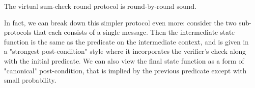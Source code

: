 \begin{theorem}
    The virtual sum-check round protocol is round-by-round sound.
    \label{thm:virtual_sumcheck_round_protocol_rbr_sound}
\end{theorem}

In fact, we can break down this simpler protocol even more: consider the two sub-protocols that each
consists of a single message. Then the intermediate state function is the same as the predicate on
the intermediate context, and is given in a "strongest post-condition" style where it incorporates
the verifier's check along with the initial predicate. We can also view the final state function as
a form of "canonical" post-condition, that is implied by the previous predicate except with small
probability.
